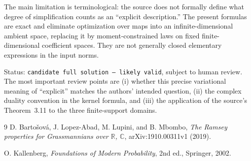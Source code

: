 \documentclass[11pt]{article}
\begin{document}
The main limitation is terminological: the source does not formally define
what degree of simplification counts as an ``explicit description.''  The
present formulas are exact and eliminate optimization over maps into an
infinite-dimensional ambient space, replacing it by moment-constrained laws
on fixed finite-dimensional coefficient spaces.  They are not generally
closed elementary expressions in the input norms.

Status: \texttt{candidate full solution -- likely valid}, subject to human
review.  The most important review points are (i) whether this precise
variational meaning of ``explicit'' matches the authors' intended question,
(ii) the complex duality convention in the kernel formula, and (iii) the
application of the source's Theorem~3.11 to the three finite-support domains.

\begin{thebibliography}{9}
D. Barto\v{s}ov\'{a}, J. Lopez-Abad, M. Lupini, and B. Mbombo,
\emph{The Ramsey properties for Grassmannians over $\mathbb R$, $\mathbb C$},
arXiv:1910.00311v1 (2019).

O. Kallenberg,
\emph{Foundations of Modern Probability}, 2nd ed., Springer, 2002.
\end{thebibliography}
\end{document}
